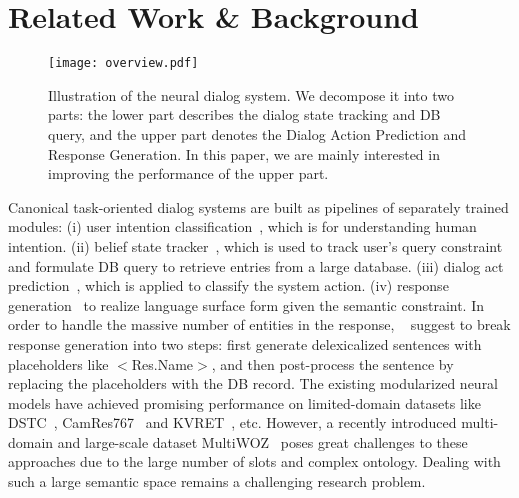 \documentclass[11pt,a4paper]{article}
\begin{document}
\section{Related Work \& Background}
\begin{figure*}[thb]
\begin{center}
    \texttt{[image: overview.pdf]}
    \end{center}
    \caption{Illustration of the neural dialog system. We decompose it into two parts: the lower part describes the dialog state tracking and DB query, and the upper part denotes the Dialog Action Prediction and Response Generation. In this paper, we are mainly interested in improving the performance of the upper part. }
    \label{fig:overview}
\end{figure*}
Canonical task-oriented dialog systems are built as pipelines of separately trained modules: (i) user intention classification~\cite{DBLP:conf/naacl/ShiYTJ16,DBLP:conf/naacl/GooGHHCHC18}, which is for understanding human intention. (ii) belief state tracker~\cite{DBLP:conf/sigdial/WilliamsRRB13,DBLP:conf/acl/MrksicSWTY17,DBLP:journals/tacl/MrksicVSLRGKY17,zhong2018global,chen2018xl}, which is used to track user's query constraint and formulate DB query to retrieve entries from a large database. (iii) dialog act prediction~\cite{DBLP:conf/icml/WenMBY17}, which is applied to classify the system action. (iv) response generation~\cite{DBLP:conf/eacl/Rojas-BarahonaG17,DBLP:conf/naacl/WenGMRSVY16,DBLP:conf/ijcnlp/LiCLGC17,DBLP:conf/acl/KanHLJRY18} to realize language surface form given the semantic constraint. In order to handle the massive number of entities in the response, ~\citet{DBLP:conf/eacl/Rojas-BarahonaG17,DBLP:conf/naacl/WenGMRSVY16,DBLP:conf/emnlp/WenGMSVY15} suggest to break response generation into two steps: first generate delexicalized sentences with placeholders like $<$Res.Name$>$, and then post-process the sentence by replacing the placeholders with the DB record. The existing modularized neural models have achieved promising performance on  limited-domain datasets like DSTC~\cite{DBLP:journals/dad/WilliamsRH16a}, CamRes767~\cite{DBLP:conf/eacl/Rojas-BarahonaG17} and KVRET~\cite{DBLP:conf/sigdial/EricKCM17}, etc. However, a recently introduced multi-domain and large-scale dataset MultiWOZ~\cite{DBLP:conf/emnlp/BudzianowskiWTC18} poses great challenges to these approaches due to the large number of slots and complex ontology. Dealing with such a large semantic space remains a challenging research problem.
\end{document}
